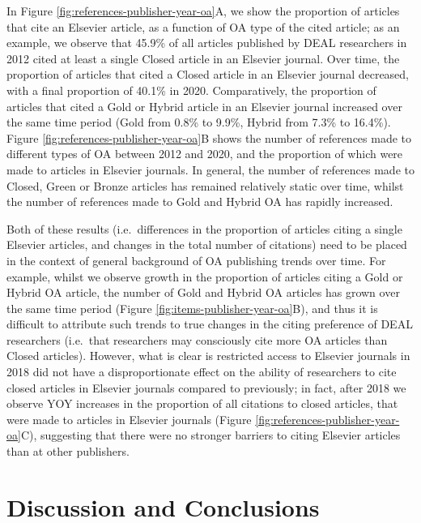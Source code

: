\documentclass[
]{article}
\begin{document}
In Figure \ref{fig:references-publisher-year-oa}A, we show the proportion of articles that cite an Elsevier article, as a function of OA type of the cited article; as an example, we observe that 45.9\% of all articles published by DEAL researchers in 2012 cited at least a single Closed article in an Elsevier journal. Over time, the proportion of articles that cited a Closed article in an Elsevier journal decreased, with a final proportion of 40.1\% in 2020. Comparatively, the proportion of articles that cited a Gold or Hybrid article in an Elsevier journal increased over the same time period (Gold from 0.8\% to 9.9\%, Hybrid from 7.3\% to 16.4\%). Figure \ref{fig:references-publisher-year-oa}B shows the number of references made to different types of OA between 2012 and 2020, and the proportion of which were made to articles in Elsevier journals. In general, the number of references made to Closed, Green or Bronze articles has remained relatively static over time, whilst the number of references made to Gold and Hybrid OA has rapidly increased.

Both of these results (i.e.~differences in the proportion of articles citing a single Elsevier articles, and changes in the total number of citations) need to be placed in the context of general background of OA publishing trends over time. For example, whilst we observe growth in the proportion of articles citing a Gold or Hybrid OA article, the number of Gold and Hybrid OA articles has grown over the same time period (Figure \ref{fig:items-publisher-year-oa}B), and thus it is difficult to attribute such trends to true changes in the citing preference of DEAL researchers (i.e.~that researchers may consciously cite more OA articles than Closed articles). However, what is clear is restricted access to Elsevier journals in 2018 did not have a disproportionate effect on the ability of researchers to cite closed articles in Elsevier journals compared to previously; in fact, after 2018 we observe YOY increases in the proportion of all citations to closed articles, that were made to articles in Elsevier journals (Figure \ref{fig:references-publisher-year-oa}C), suggesting that there were no stronger barriers to citing Elsevier articles than at other publishers.

\hypertarget{discussion-and-conclusions}{%
\section{Discussion and Conclusions}\label{discussion-and-conclusions}}
\end{document}

